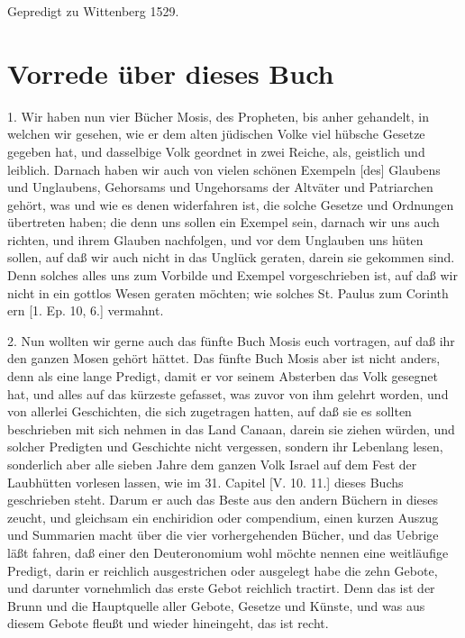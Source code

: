 Gepredigt zu Wittenberg 1529.

\section{Vorrede über dieses Buch}

1. Wir haben nun vier Bücher Mosis, des Propheten, bis anher gehandelt, in welchen wir gesehen, wie er dem alten jüdischen Volke viel hübsche Gesetze gegeben hat, und dasselbige Volk geordnet in zwei Reiche, als, geistlich und leiblich. Darnach haben wir auch von vielen schönen Exempeln [des] Glaubens und Unglaubens, Gehorsams und Ungehorsams der Altväter und Patriarchen gehört, was und wie es denen widerfahren ist, die solche Gesetze und Ordnungen übertreten haben; die denn uns sollen ein Exempel sein, darnach wir uns auch richten, und ihrem Glauben nachfolgen, und vor dem Unglauben uns hüten sollen, auf daß wir auch nicht in das Unglück geraten, darein sie gekommen sind. Denn solches alles uns zum Vorbilde und Exempel vorgeschrieben ist, auf daß wir nicht in ein gottlos Wesen geraten möchten; wie solches St. Paulus zum Corinth ern [1. Ep. 10, 6.] vermahnt.

2. Nun wollten wir gerne auch das fünfte Buch Mosis euch vortragen, auf daß ihr den ganzen Mosen gehört hättet. Das fünfte Buch Mosis aber ist nicht anders, denn als eine lange Predigt, damit er vor seinem Absterben das Volk gesegnet hat, und alles auf das kürzeste gefasset, was zuvor von ihm gelehrt worden, und von allerlei Geschichten, die sich zugetragen hatten, auf daß sie es sollten beschrieben mit sich nehmen in das Land Canaan, darein sie ziehen würden, und solcher Predigten und Geschichte nicht vergessen, sondern ihr Lebenlang lesen,
sonderlich aber alle sieben Jahre dem ganzen Volk Israel auf dem Fest der Laubhütten vorlesen lassen, wie im 31. Capitel [V. 10. 11.] dieses Buchs geschrieben steht. Darum er auch das Beste aus den andern Büchern in dieses zeucht, und gleichsam ein enchiridion oder compendium, einen kurzen Auszug und Summarien macht über die vier vorhergehenden Bücher, und das Uebrige läßt fahren, daß einer den Deuteronomium wohl möchte nennen eine weitläufige Predigt, darin er reichlich ausgestrichen oder ausgelegt habe die zehn Gebote, und darunter vornehmlich das erste Gebot reichlich tractirt. Denn das ist der Brunn und die Hauptquelle aller Gebote, Gesetze und Künste, und was aus diesem Gebote fleußt und wieder hineingeht, das ist recht.

